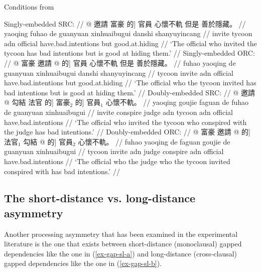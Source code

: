 \pex[everygla = \zh, belowglpreambleskip = -3pt] \label{ex-gap-canon}
Conditions from \textcite{hsiao.gibson2003}\par\nobreak
\a 
\begingl
\glpreamble Singly-embedded SRC: //
\gla \nogloss{[\textit{e} } @ 邀請 富豪 的] 官員 心懷不軌 但是 善於隱藏。 //
\glb yaoqing fuhao de guanyuan xinhuaibugui danshi shanyuyincang //
\glc invite tycoon {\sc adn} official have.bad.intentions but good.at.hiding //
\glft `The official who invited the tycoon has bad intentions but is good at hiding them.' //
\endgl\label{ex-hsiao-a}
\a
\begingl
\glpreamble Singly-embedded ORC: //
\gla \nogloss{[} @ 富豪 邀請  @ 的] 官員 心懷不軌 但是 善於隱藏。 //
\glb fuhao yaoqing de guanyuan xinhuaibugui danshi shanyuyincang //
\glc tycoon invite {\sc adn} official have.bad.intentions but good.at.hiding //
\glft `The official who the tycoon invited has bad intentions but is good at hiding them.' //
\endgl\label{ex-hsiao-b}
\a 
\begingl
\glpreamble Doubly-embedded SRC: //
\gla \nogloss{[\textit{e}$_1$ } @ 邀請 \nogloss{[\textit{e}$_2$ } @ 勾結 法官 的] 富豪$_2$ 的] 官員$_1$ 心懷不軌。 //
\glb yaoqing goujie faguan de fuhao de guanyuan xinhuaibugui  //
\glc invite conspire judge {\sc adn} tycoon {\sc adn} official have.bad.intentions //
\glft `The official who invited the tycoon who conspired with the judge has bad intentions.' //
\endgl\label{ex-hsiao-c}
\a 
\begingl
\glpreamble Doubly-embedded ORC: //
\gla \nogloss{[[} @ 富豪 邀請  @ 的] 法官$_1$ 勾結  @ 的] 官員$_2$ 心懷不軌。 //
\glb fuhao yaoqing de faguan goujie de guanyuan xinhuaibugui //
\glc tycoon invite {\sc adn} judge conspire {\sc adn} official have.bad.intentions //
\glft `The official who the judge who the tycoon invited conspired with has bad intentions.' //
\endgl\label{ex-hsiao-d}
\xe 

\subsection{The short-distance vs. long-distance asymmetry}\label{gap-sl}

Another processing asymmetry that has been examined in the experimental literature is the one that exists between short-distance (monoclausal) gapped dependencies like the one in (\ref{ex-gap-sl-a}) and long-distance (cross-clausal) gapped dependencies like the one in (\ref{ex-gap-sl-b}). 

